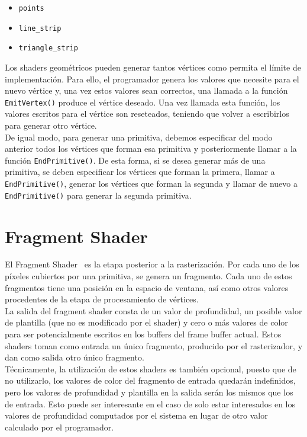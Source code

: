 \begin{itemize}
		\item \verb|points|	
		\item \verb|line_strip|
		\item \verb|triangle_strip|
\end{itemize}

Los shaders geométricos pueden generar tantos vértices como permita el límite de
implementación. Para ello, el programador genera los valores que necesite para
el nuevo vértice y, una vez estos valores sean correctos, una llamada a la
función \verb|EmitVertex()| produce el vértice deseado. Una vez llamada esta
función, los valores escritos para el vértice son reseteados, teniendo que
volver a escribirlos para generar otro vértice. \\

De igual modo, para generar una primitiva, debemos especificar del modo anterior
todos los vértices que forman esa primitiva y posteriormente llamar a la función
\verb|EndPrimitive()|. De esta forma, si se desea generar más de una primitiva,
se deben especificar los vértices que forman la primera, llamar a
\verb|EndPrimitive()|, generar los vértices que forman la segunda y llamar de
nuevo a \verb|EndPrimitive()| para generar la segunda primitiva.

\section{Fragment Shader}
\label{ref:FragShader}

El Fragment Shader~\cite{FragShader} es la etapa posterior a la rasterización.
Por cada uno de los píxeles cubiertos por una primitiva, se genera un fragmento.
Cada uno de estos fragmentos tiene una posición en la espacio de ventana, así
como otros valores procedentes de la etapa de procesamiento de vértices. \\ 

La salida del fragment shader consta de un valor de profundidad, un posible
valor de plantilla (que no es modificado por el shader) y cero o más valores de
color para ser potencialmente escritos en los buffers del frame buffer actual.
Estos shaders toman como entrada un único fragmento, producido por el
rasterizador, y dan como salida otro único fragmento. \\

Técnicamente, la utilización de estos shaders es también opcional, puesto que de
no utilizarlo, los valores de color del fragmento de entrada quedarán
indefinidos, pero los valores de profundidad y plantilla en la salida serán los
mismos que los de entrada. Esto puede ser interesante en el caso de solo estar
interesados en los valores de profundidad computados por el sistema en lugar de
otro valor calculado por el programador. \\

